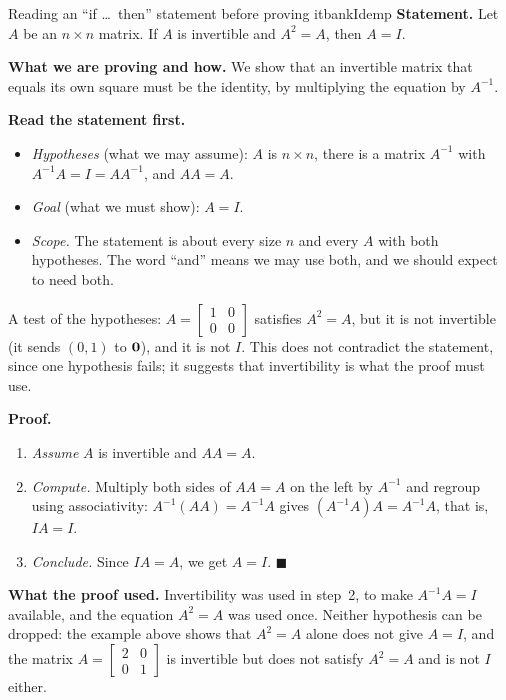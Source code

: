 \documentclass[11pt]{article}
\begin{document}
\begin{exmp}{Reading an ``if \dots\ then'' statement before proving it}{bankIdemp}
\textbf{Statement.} Let $A$ be an $n\times n$ matrix. If $A$ is invertible and $A^2=A$, then $A=I$.

\textbf{What we are proving and how.} We show that an invertible matrix that equals its own square must be the identity, by multiplying the equation by $A^{-1}$.

\textbf{Read the statement first.}
\begin{itemize}
  \item \emph{Hypotheses} (what we may assume): $A$ is $n\times n$, there is a matrix $A^{-1}$ with $A^{-1}A=I=AA^{-1}$, and $AA=A$.
  \item \emph{Goal} (what we must show): $A=I$.
  \item \emph{Scope.} The statement is about every size $n$ and every $A$ with both hypotheses. The word ``and'' means we may use both, and we should expect to need both.
\end{itemize}
A test of the hypotheses: $A=\begin{bmatrix}1&0\\0&0\end{bmatrix}$ satisfies $A^2=A$, but it is not invertible (it sends $(0,1)$ to $\mathbf{0}$), and it is not $I$. This does not contradict the statement, since one hypothesis fails; it suggests that invertibility is what the proof must use.

\textbf{Proof.}
\begin{enumerate}[itemsep=2pt]
  \item \emph{Assume} $A$ is invertible and $AA=A$.
  \item \emph{Compute.} Multiply both sides of $AA=A$ on the left by $A^{-1}$ and regroup using associativity: $A^{-1}(AA)=A^{-1}A$ gives $(A^{-1}A)A=A^{-1}A$, that is, $IA=I$.
  \item \emph{Conclude.} Since $IA=A$, we get $A=I$. \qquad$\blacksquare$
\end{enumerate}

\textbf{What the proof used.} Invertibility was used in step~2, to make $A^{-1}A=I$ available, and the equation $A^2=A$ was used once. Neither hypothesis can be dropped: the example above shows that $A^2=A$ alone does not give $A=I$, and the matrix $A=\begin{bmatrix}2&0\\0&1\end{bmatrix}$ is invertible but does not satisfy $A^2=A$ and is not $I$ either.
\end{exmp}
\end{document}
